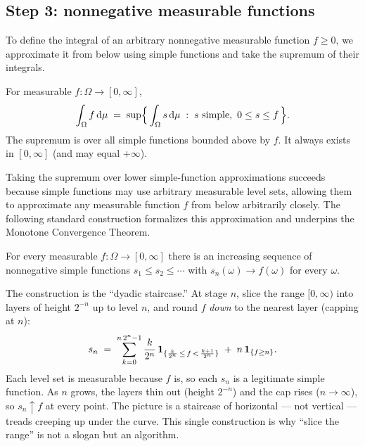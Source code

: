 \subsection{Step 3: nonnegative measurable functions}

To define the integral of an arbitrary nonnegative measurable function $f\ge 0$,
we approximate it from below using simple functions and take the supremum of their integrals.

\begin{definition}
\label{ch37:def-int-nonneg}
For measurable $f\colon\Omega\to[0,\infty]$,
\[
  \int_\Omega f \,\dd\mu \;=\; \sup\set[\Big]{\, \int_\Omega s\,\dd\mu \;:\; s
  \text{ simple},\ 0 \le s \le f \,}.
\]
The supremum is over all simple functions bounded above by $f$. It always
exists in $[0,\infty]$ (and may equal $+\infty$).
\end{definition}

Taking the supremum over lower simple-function approximations succeeds because
simple functions may use arbitrary measurable level sets, allowing them to
approximate any measurable function $f$ from below arbitrarily closely.
The following standard construction formalizes this approximation and underpins
the Monotone Convergence Theorem.

\begin{theorem}
\label{ch37:thm-approx}
For every measurable $f\colon\Omega\to[0,\infty]$ there is an increasing
sequence of nonnegative simple functions $s_1\le s_2\le \cdots$ with
$s_n(\omega)\to f(\omega)$ for every $\omega$.
\end{theorem}

\begin{whybox}
The construction is the ``dyadic staircase.'' At stage $n$, slice the range
$[0,\infty)$ into layers of height $2^{-n}$ up to level $n$, and round $f$
\emph{down} to the nearest layer (capping at $n$):
\[
  s_n \;=\; \sum_{k=0}^{n\,2^n-1} \frac{k}{2^n}\,
  \ind_{\set{\frac{k}{2^n}\,\le\, f\,<\,\frac{k+1}{2^n}}}
  \;+\; n\,\ind_{\set{f\ge n}}.
\]
Each level set is measurable because $f$ is, so each $s_n$ is a legitimate
simple function. As $n$ grows, the layers thin out (height $2^{-n}$) and the cap
rises ($n\to\infty$), so $s_n\uparrow f$ at every point. The picture is a
staircase of horizontal --- not vertical --- treads creeping up under the curve.
This single construction is why ``slice the range'' is not a slogan but an
algorithm.
\end{whybox}


